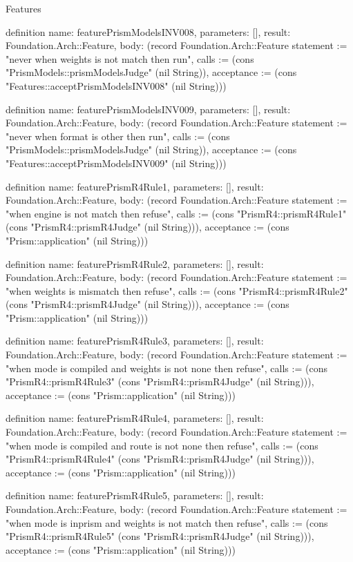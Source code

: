 \begin{lexlean}{Features}
\begin{semanticmodule}
definition{
  name: featurePrismModelsINV008,
  parameters: [],
  result: Foundation.Arch::Feature,
  body: (record Foundation.Arch::Feature {statement := "never when weights is not match then run", calls := (cons "PrismModels::prismModelsJudge" (nil String)), acceptance := (cons "Features::acceptPrismModelsINV008" (nil String))})
}

definition{
  name: featurePrismModelsINV009,
  parameters: [],
  result: Foundation.Arch::Feature,
  body: (record Foundation.Arch::Feature {statement := "never when format is other then run", calls := (cons "PrismModels::prismModelsJudge" (nil String)), acceptance := (cons "Features::acceptPrismModelsINV009" (nil String))})
}

definition{
  name: featurePrismR4Rule1,
  parameters: [],
  result: Foundation.Arch::Feature,
  body: (record Foundation.Arch::Feature {statement := "when engine is not match then refuse", calls := (cons "PrismR4::prismR4Rule1" (cons "PrismR4::prismR4Judge" (nil String))), acceptance := (cons "Prism::application" (nil String))})
}

definition{
  name: featurePrismR4Rule2,
  parameters: [],
  result: Foundation.Arch::Feature,
  body: (record Foundation.Arch::Feature {statement := "when weights is mismatch then refuse", calls := (cons "PrismR4::prismR4Rule2" (cons "PrismR4::prismR4Judge" (nil String))), acceptance := (cons "Prism::application" (nil String))})
}

definition{
  name: featurePrismR4Rule3,
  parameters: [],
  result: Foundation.Arch::Feature,
  body: (record Foundation.Arch::Feature {statement := "when mode is compiled and weights is not none then refuse", calls := (cons "PrismR4::prismR4Rule3" (cons "PrismR4::prismR4Judge" (nil String))), acceptance := (cons "Prism::application" (nil String))})
}

definition{
  name: featurePrismR4Rule4,
  parameters: [],
  result: Foundation.Arch::Feature,
  body: (record Foundation.Arch::Feature {statement := "when mode is compiled and route is not none then refuse", calls := (cons "PrismR4::prismR4Rule4" (cons "PrismR4::prismR4Judge" (nil String))), acceptance := (cons "Prism::application" (nil String))})
}

definition{
  name: featurePrismR4Rule5,
  parameters: [],
  result: Foundation.Arch::Feature,
  body: (record Foundation.Arch::Feature {statement := "when mode is inprism and weights is not match then refuse", calls := (cons "PrismR4::prismR4Rule5" (cons "PrismR4::prismR4Judge" (nil String))), acceptance := (cons "Prism::application" (nil String))})
}


\end{semanticmodule}
\end{lexlean}
